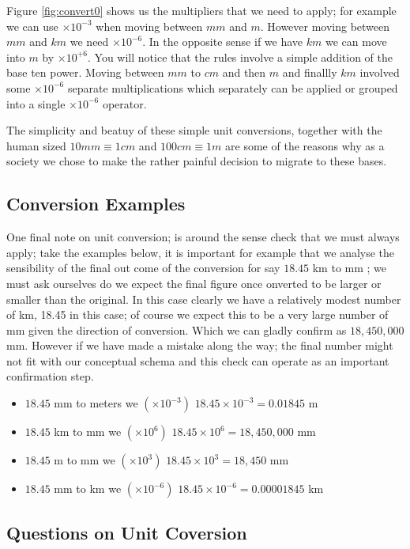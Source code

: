 Figure \ref{fig:convert0} shows us the multipliers that we need to apply; for example we can use $ \times 10^{-3}$ when moving between $mm$ and $m$. However moving between $mm$ and $km$ we need $ \times 10^{-6}$. In the opposite sense if we have $km$ we can move into $m$ by $ \times 10^{+6}$. You will notice that the rules involve a simple addition of the base ten power. Moving between $mm$ to $cm$ and then $m$ and finallly $km$ involved some $ \times 10^{-6}$ separate multiplications which separately can be applied or grouped into a single $ \times 10^{-6}$ operator. 

The simplicity and beatuy of these simple unit conversions, together with the human sized $ 10mm \equiv 1 cm $ and $ 100cm \equiv 1m $ are some of the reasons why as a society we chose to make the rather painful decision to migrate to these bases.

\subsection{Conversion Examples}

One final note on unit conversion; is around the sense check that we must always apply; take the examples below, it is important for example that we analyse the sensibility of the final out come of the conversion for say  $18.45$ km to mm ; we must ask ourselves do we expect the final figure once onverted to be larger or smaller than the original. In this case clearly we have a relatively modest number of km, 18.45 in this case; of course we expect this to be a very large number of mm given the direction of conversion. Which we can gladly confirm as  $  18,450,000$ mm. However if we have made a mistake along the way; the final number might not fit with our conceptual schema and this check can operate as an important confirmation step.

\begin{itemize}
  \item \eg $18.45$ mm to meters we $(\times 10^{-3}) $ $18.45 \times 10^{-3} = 0.01845$ m
  \item \eg $18.45$ km to mm we $(\times 10^{6}) $ $18.45 \times 10^{6} = 18,450,000$ mm
  \item \eg $18.45$ m to mm we $(\times 10^{3}) $ $18.45 \times 10^{3} = 18,450 $ mm
  \item \eg $18.45$ mm to km we $(\times 10^{-6}) $ $18.45 \times 10^{-6} = 0.00001845$ km
\end{itemize}

\subsection{Questions on Unit Coversion}

